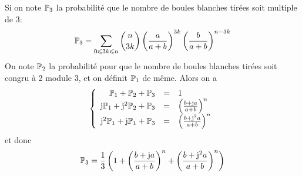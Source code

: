 \documentclass[12pt]{article}
\begin{document}
\begin{remark}
    Si on note $\P_{3}$ la probabilité que le nombre de boules blanches tirées soit multiple de 3:
    \begin{equation}
        \P_{3}=\sum_{0\leqslant 3k\leqslant n}\binom{n}{3k}\left(\frac{a}{a+b}\right)^{3k}\left(\frac{b}{a+b}\right)^{n-3k}
    \end{equation}
    On note $\P_{2}$ la probabilité pour que le nombre de boules blanches tirées soit congru à 2 module 3, et on définit $\P_{1}$ de même.
    Alors on a 
    \begin{equation}
        \left\{
            \begin{array}[]{rcl}
                \P_{1}+\P_{2}+\P_{3} &= &1\\
                \mathrm{j}\P_{1}+\mathrm{j}^{2}\P_{2}+\P_{3} &= &\left(\frac{b+\mathrm{j}a}{a+b}\right)^{n}\\
                \mathrm{j}^{2}\P_{1}+\mathrm{j}\P_{1}+\P_{3} &= &\left(\frac{b+\mathrm{j}^{2}a}{a+b}\right)^{n}
            \end{array}
        \right.
    \end{equation}
    et donc 
    \begin{equation}
        \P_{3}=\frac{1}{3}\left(1+\left(\frac{b+\mathrm{j}a}{a+b}\right)^{n}+\left(\frac{b+\mathrm{j}^{2}a}{a+b}\right)^{n}\right)
    \end{equation}
\end{remark}
\end{document}
